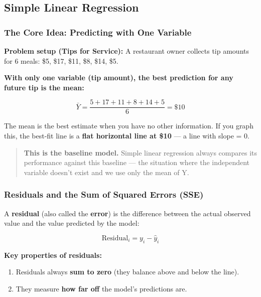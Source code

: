 \documentclass[12pt,openany]{book}
\begin{document}
\medskip


\subsection{Simple Linear Regression}


\subsubsection{The Core Idea: Predicting with One Variable}


\textbf{Problem setup (Tips for Service):}
A restaurant owner collects tip amounts for 6 meals: \$5, \$17, \$11, \$8, \$14, \$5.

\textbf{With only one variable (tip amount), the best prediction for any future tip is the mean:}

\[
\bar{Y} = \frac{5 + 17 + 11 + 8 + 14 + 5}{6} = \$10
\]


The mean is the best estimate when you have no other information. If you graph this, the best-fit line is a \textbf{flat horizontal line at \$10} --- a line with slope = 0.

\begin{quote}
\textbf{This is the baseline model.} Simple linear regression always compares its performance against this baseline --- the situation where the independent variable doesn't exist and we use only the mean of Y.
\end{quote}


\medskip


\subsubsection{Residuals and the Sum of Squared Errors (SSE)}


A \textbf{residual} (also called the \textbf{error}) is the difference between the actual observed value and the value predicted by the model:

\[
\text{Residual}_i = y_i - \hat{y}_i
\]


\textbf{Key properties of residuals:}
\begin{enumerate}[leftmargin=*]
    \item Residuals always \textbf{sum to zero} (they balance above and below the line).
    \item They measure \textbf{how far off} the model's predictions are.

\end{enumerate}
\end{document}
